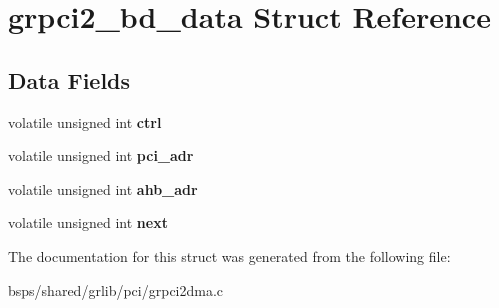 \hypertarget{structgrpci2__bd__data}{}\section{grpci2\+\_\+bd\+\_\+data Struct Reference}
\label{structgrpci2__bd__data}
\subsection*{Data Fields}
\begin{DoxyCompactItemize}
\item 
\mbox{\label{structgrpci2__bd__data_a32d599de39590f5150f365138d28e218}} 
volatile unsigned int {\bfseries ctrl}
\item 
\mbox{\label{structgrpci2__bd__data_abe14ab31bf6c65ec5ce3834fa60fd209}} 
volatile unsigned int {\bfseries pci\+\_\+adr}
\item 
\mbox{\label{structgrpci2__bd__data_ae23f45c1550a4f6d446b2bbdde196504}} 
volatile unsigned int {\bfseries ahb\+\_\+adr}
\item 
\mbox{\label{structgrpci2__bd__data_a5358a66379c06eed026870aa8e1fcab0}} 
volatile unsigned int {\bfseries next}
\end{DoxyCompactItemize}


The documentation for this struct was generated from the following file\+:\begin{DoxyCompactItemize}
\item 
bsps/shared/grlib/pci/grpci2dma.\+c\end{DoxyCompactItemize}
